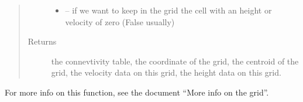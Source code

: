 \documentclass[letterpaper,10pt,english]{sphinxmanual}
\begin{document}
\begin{fulllineitems}
\begin{quote}
\begin{description}
\begin{itemize}
\item {} 
 -- if we want to keep in the grid the cell with an height or velocity of zero (False usually)

\end{itemize}

\item[{Returns}] \leavevmode
the connevtivity table, the coordinate of the grid, the centroid of the grid, the velocity data on this
grid, the height data on this grid.

\end{description}\end{quote}

For more info on this function, see the document ``More info on the grid''.

\end{fulllineitems}

\end{document}
